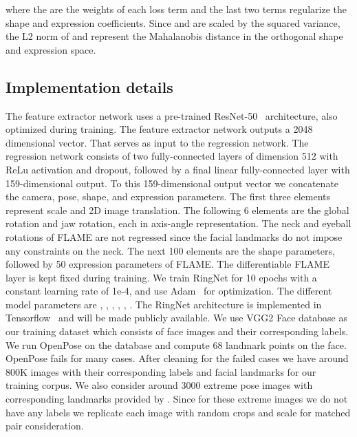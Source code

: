 where the  are the weights of each loss term and the last two terms regularize the shape and expression coefficients. Since  and  are scaled by the squared variance, the L2 norm of  and  represent the Mahalanobis distance in the orthogonal shape and expression space.


\subsection{Implementation details}

The feature extractor network uses a pre-trained ResNet-50~\cite{He1} architecture, also optimized during training. The feature extractor network outputs a 2048 dimensional vector. That serves as input to the regression network. The regression network consists of two fully-connected layers of dimension 512 with ReLu activation and dropout, followed by a final linear fully-connected layer with 159-dimensional output. 
To this 159-dimensional output vector we concatenate the camera, pose, shape, and expression parameters. The first three elements represent scale and 2D image translation. The following 6 elements are the global rotation and jaw rotation, each in axis-angle representation. The neck and eyeball rotations of FLAME are not regressed since the facial landmarks do not impose any constraints on the neck. The next 100 elements are the shape parameters, followed by 50 expression parameters of FLAME. The differentiable FLAME layer is kept fixed during training. 
We train RingNet for 10 epochs with a constant learning rate of 1e-4, and use Adam~\cite{kinga2015method} for optimization. The different model parameters are , , , , , . The RingNet architecture is implemented in Tensorflow~\cite{abadi2016tensorflow} and will be made publicly available.
We use VGG2 Face database \cite{Cao18} as our training dataset which consists of face images and their corresponding labels.
We run OpenPose  \cite{simon2017hand} on the database and compute 68 landmark points on the face.
OpenPose fails for many cases.
After cleaning for the failed cases we have around 800K images with their corresponding labels and facial landmarks for our training corpus.
We also consider around 3000 extreme pose images with corresponding landmarks provided by \cite{bulat2017far}.
Since for these extreme images we do not have any labels we replicate each image with random crops and scale for matched pair consideration.
